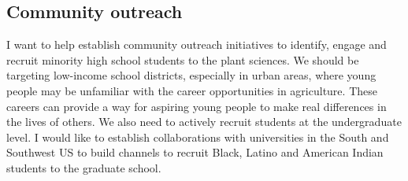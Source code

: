 \documentclass[11pt]{article}
\begin{document}











\subsection*{Community outreach}

I want to help establish community outreach initiatives to identify, engage and recruit minority high school students to the plant sciences. We should be targeting low-income school districts, especially in urban areas, where young people may be unfamiliar with the career opportunities in agriculture. These careers can provide a way for aspiring young people to make real differences in the lives of others. We also need to actively recruit students at the undergraduate level. I would like to establish collaborations with universities in the South and Southwest US to build channels to recruit Black, Latino and American Indian students to the graduate school. 
\end{document}
